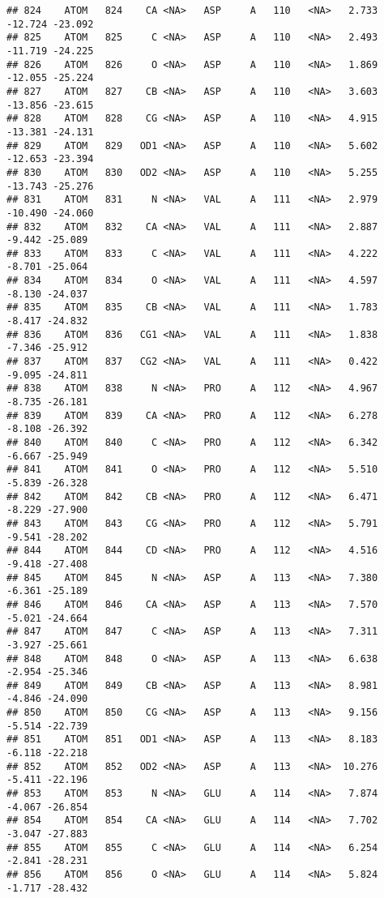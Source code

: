 \documentclass[
]{article}
\begin{document}
\begin{verbatim}
## 824    ATOM   824    CA <NA>   ASP     A   110   <NA>   2.733 -12.724 -23.092
## 825    ATOM   825     C <NA>   ASP     A   110   <NA>   2.493 -11.719 -24.225
## 826    ATOM   826     O <NA>   ASP     A   110   <NA>   1.869 -12.055 -25.224
## 827    ATOM   827    CB <NA>   ASP     A   110   <NA>   3.603 -13.856 -23.615
## 828    ATOM   828    CG <NA>   ASP     A   110   <NA>   4.915 -13.381 -24.131
## 829    ATOM   829   OD1 <NA>   ASP     A   110   <NA>   5.602 -12.653 -23.394
## 830    ATOM   830   OD2 <NA>   ASP     A   110   <NA>   5.255 -13.743 -25.276
## 831    ATOM   831     N <NA>   VAL     A   111   <NA>   2.979 -10.490 -24.060
## 832    ATOM   832    CA <NA>   VAL     A   111   <NA>   2.887  -9.442 -25.089
## 833    ATOM   833     C <NA>   VAL     A   111   <NA>   4.222  -8.701 -25.064
## 834    ATOM   834     O <NA>   VAL     A   111   <NA>   4.597  -8.130 -24.037
## 835    ATOM   835    CB <NA>   VAL     A   111   <NA>   1.783  -8.417 -24.832
## 836    ATOM   836   CG1 <NA>   VAL     A   111   <NA>   1.838  -7.346 -25.912
## 837    ATOM   837   CG2 <NA>   VAL     A   111   <NA>   0.422  -9.095 -24.811
## 838    ATOM   838     N <NA>   PRO     A   112   <NA>   4.967  -8.735 -26.181
## 839    ATOM   839    CA <NA>   PRO     A   112   <NA>   6.278  -8.108 -26.392
## 840    ATOM   840     C <NA>   PRO     A   112   <NA>   6.342  -6.667 -25.949
## 841    ATOM   841     O <NA>   PRO     A   112   <NA>   5.510  -5.839 -26.328
## 842    ATOM   842    CB <NA>   PRO     A   112   <NA>   6.471  -8.229 -27.900
## 843    ATOM   843    CG <NA>   PRO     A   112   <NA>   5.791  -9.541 -28.202
## 844    ATOM   844    CD <NA>   PRO     A   112   <NA>   4.516  -9.418 -27.408
## 845    ATOM   845     N <NA>   ASP     A   113   <NA>   7.380  -6.361 -25.189
## 846    ATOM   846    CA <NA>   ASP     A   113   <NA>   7.570  -5.021 -24.664
## 847    ATOM   847     C <NA>   ASP     A   113   <NA>   7.311  -3.927 -25.661
## 848    ATOM   848     O <NA>   ASP     A   113   <NA>   6.638  -2.954 -25.346
## 849    ATOM   849    CB <NA>   ASP     A   113   <NA>   8.981  -4.846 -24.090
## 850    ATOM   850    CG <NA>   ASP     A   113   <NA>   9.156  -5.514 -22.739
## 851    ATOM   851   OD1 <NA>   ASP     A   113   <NA>   8.183  -6.118 -22.218
## 852    ATOM   852   OD2 <NA>   ASP     A   113   <NA>  10.276  -5.411 -22.196
## 853    ATOM   853     N <NA>   GLU     A   114   <NA>   7.874  -4.067 -26.854
## 854    ATOM   854    CA <NA>   GLU     A   114   <NA>   7.702  -3.047 -27.883
## 855    ATOM   855     C <NA>   GLU     A   114   <NA>   6.254  -2.841 -28.231
## 856    ATOM   856     O <NA>   GLU     A   114   <NA>   5.824  -1.717 -28.432

\end{verbatim}
\end{document}

